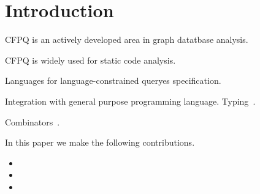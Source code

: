 \section{Introduction}

CFPQ is an actively developed area in graph datatbase analysis.

CFPQ is widely used for static code analysis.

Languages for language-constrained queryes specification.

Integration with general purpose programming language. Typing~\cite{10.1145/2076623.2076653}.

Combinators~\cite{10.1145/3241653.3241655}.

In this paper we make the following contributions.
\begin{itemize}
  \item
  \item
  \item
\end{itemize}
